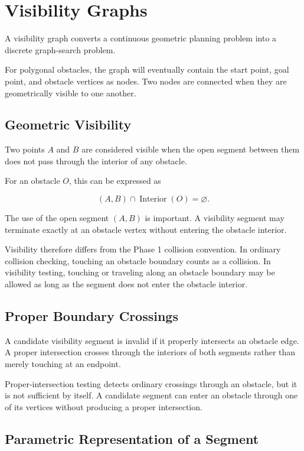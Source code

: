 \section{Visibility Graphs}

A visibility graph converts a continuous geometric planning problem into a
discrete graph-search problem.

For polygonal obstacles, the graph will eventually contain the start point,
goal point, and obstacle vertices as nodes. Two nodes are connected when they
are geometrically visible to one another.

\subsection{Geometric Visibility}

Two points $A$ and $B$ are considered visible when the open segment between
them does not pass through the interior of any obstacle.

For an obstacle $O$, this can be expressed as

\[
(A,B) \cap \operatorname{Interior}(O) = \varnothing.
\]

The use of the open segment $(A,B)$ is important. A visibility segment may
terminate exactly at an obstacle vertex without entering the obstacle
interior.

Visibility therefore differs from the Phase 1 collision convention. In
ordinary collision checking, touching an obstacle boundary counts as a
collision. In visibility testing, touching or traveling along an obstacle
boundary may be allowed as long as the segment does not enter the obstacle
interior.

\subsection{Proper Boundary Crossings}

A candidate visibility segment is invalid if it properly intersects an
obstacle edge. A proper intersection crosses through the interiors of both
segments rather than merely touching at an endpoint.

Proper-intersection testing detects ordinary crossings through an obstacle,
but it is not sufficient by itself. A candidate segment can enter an obstacle
through one of its vertices without producing a proper intersection.

\subsection{Parametric Representation of a Segment}

